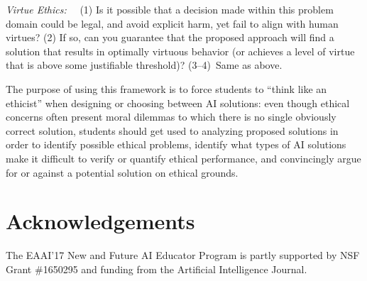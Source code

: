 \documentclass[letterpaper]{article}
\begin{document}
{\em Virtue Ethics:}~~
     (1) Is it possible that a decision made within this problem domain
        could be legal, and avoid explicit harm, yet fail to align
        with human virtues?
     (2) If so, can you guarantee that the proposed approach will find
        a solution that results in optimally virtuous behavior (or achieves a level of virtue that is above some
        justifiable threshold)?
     \mbox{(3--4)}~Same as above.

The purpose of using this framework is to force students to ``think like an ethicist'' when designing or choosing between AI solutions: even though ethical concerns often present moral dilemmas to which there is no single obviously correct solution, students should get used to analyzing proposed solutions in order to identify possible ethical problems, identify what types of AI solutions make it difficult to verify or quantify ethical performance, and convincingly argue for or against a potential solution on ethical grounds.




\section*{Acknowledgements}

The EAAI'17 New and Future AI Educator Program is partly supported by NSF Grant \#1650295 and funding from the Artificial Intelligence Journal.
\end{document}
